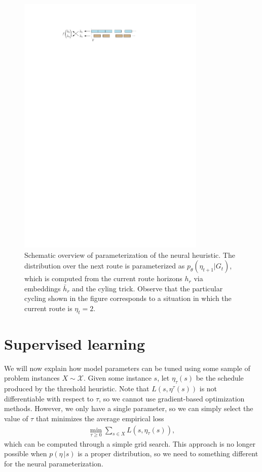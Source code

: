\documentclass[a4paper]{report}
\theoremstyle{definition}
\theoremstyle{plain}
\begin{document}
\begin{figure}
  \centering
  \includegraphics[width=0.8\textwidth]{figures/single/embedding}
  \caption{Schematic overview of parameterization of the neural heuristic. The
    distribution over the next route is parameterized as
    $p_{\theta}(\eta_{t+1} | G_{t})$, which is computed from the current route horizons
    $h_{r}$ via embeddings $\bar{h}_{r}$ and the cyling trick. Observe that the
    particular cycling shown in the figure corresponds to a situation in which
    the current route is $\eta_{t} = 2$.}\label{fig:neural_embedding}
\end{figure}


\section{Supervised learning}

We will now explain how model parameters can be tuned using some sample of
problem instances $X \sim \mathcal{X}$.
%
Given some instance $s$, let $\eta_{\tau}(s)$ be the schedule produced by the
threshold heuristic. Note that $L(s, \eta^{\tau}(s))$ is not differentiable with
respect to $\tau$, so we cannot use gradient-based optimization methods.
However, we only have a single parameter, so we can simply select the value of
$\tau$ that minimizes the average empirical loss
%
\begin{align*}
  \min_{\tau \geq 0} \sum_{s \in X} L(s, \eta_{\tau}(s)) ,
\end{align*}
%
which can be computed through a simple grid search.
%
This approach is no longer possible when $p(\eta \, | s)$ is a proper distribution,
so we need to something different for the neural parameterization.
\end{document}
